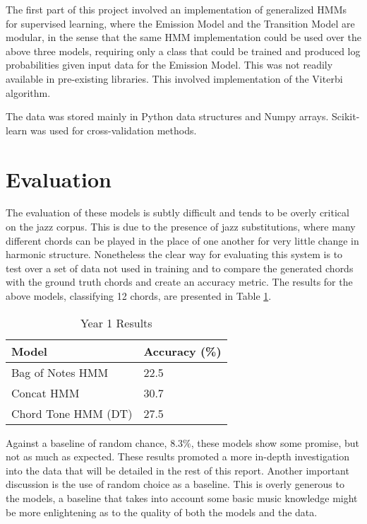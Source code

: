 \documentclass[bsc,singlespacing,parskip, deptreport]{infthesis}
\begin{document}
The first part of this project involved an implementation of generalized HMMs for supervised learning, where the Emission Model and the Transition Model are modular, in the sense that the same HMM implementation could be used over the above three models, requiring only a class that could be trained and produced log probabilities given input data for the Emission Model. This was not readily available in pre-existing libraries. This involved implementation of the Viterbi algorithm.

The data was stored mainly in Python data structures and Numpy arrays. Scikit-learn was used for cross-validation methods.

\section{Evaluation}

The evaluation of these models is subtly difficult and tends to be overly critical on the jazz corpus. This is due to the presence of jazz substitutions, where many different chords can be played in the place of one another for very little change in harmonic structure. Nonetheless the clear way for evaluating this system is to test over a set of data not used in training and to compare the generated chords with the ground truth chords and create an accuracy metric. The results for the above models, classifying 12 chords, are presented in Table \ref{12}.

\begin{table}
\centering
\caption{Year 1 Results}
\label{12}
\begin{tabular}{l|l}
Model               & Accuracy (\%) \\ \hline
Bag of Notes HMM    & 22.5           \\
Concat HMM          & 30.7          \\
Chord Tone HMM (DT) & 27.5          \\
\end{tabular}
\end{table}

Against a baseline of random chance, 8.3\%, these models show some promise, but not as much as expected. These results promoted a more in-depth investigation into the data that will be detailed in the rest of this report. Another important discussion is the use of random choice as a baseline. This is overly generous to the models, a baseline that takes into account some basic music knowledge might be more enlightening as to the quality of both the models and the data.
\end{document}
